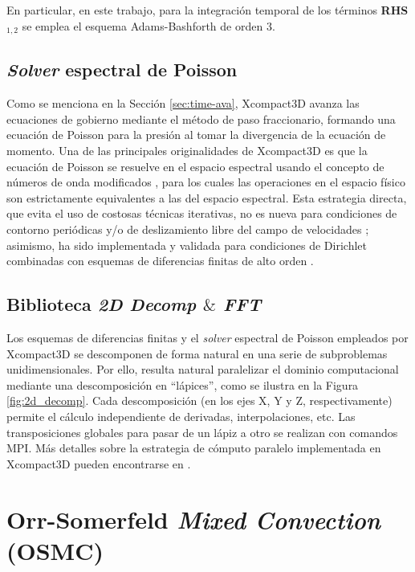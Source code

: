 En particular, en este trabajo, para la integración temporal de los términos \textbf{RHS}$_{1,2}$ se emplea el esquema Adams-Bashforth de orden 3.



\subsection{\textit{Solver} espectral de Poisson}

Como se menciona en la Sección \ref{sec:time-ava}, Xcompact3D avanza las ecuaciones de gobierno mediante el método de paso fraccionario, formando una ecuación de Poisson para la presión al tomar la divergencia de la ecuación de momento. Una de las principales originalidades de Xcompact3D es que la ecuación de Poisson se resuelve en el espacio espectral usando el concepto de números de onda modificados \cite{lele1992compact}, para los cuales las operaciones en el espacio físico son estrictamente equivalentes a las del espacio espectral. Esta estrategia directa, que evita el uso de costosas técnicas iterativas, no es nueva para condiciones de contorno periódicas y/o de deslizamiento libre del campo de velocidades \cite{schumann1976direct}; asimismo, ha sido implementada y validada para condiciones de Dirichlet combinadas con esquemas de diferencias finitas de alto orden \cite{laizet2009high}.

\subsection{Biblioteca \textit{2D Decomp $\&$ FFT}}

Los esquemas de diferencias finitas y el \textit{solver} espectral de Poisson empleados por Xcompact3D se descomponen de forma natural en una serie de subproblemas unidimensionales. Por ello, resulta natural paralelizar el dominio computacional mediante una descomposición en “lápices”, como se ilustra en la Figura \ref{fig:2d_decomp}. Cada descomposición (en los ejes X, Y y Z, respectivamente) permite el cálculo independiente de derivadas, interpolaciones, etc. Las transposiciones globales para pasar de un lápiz a otro se realizan con comandos MPI. Más detalles sobre la estrategia de cómputo paralelo implementada en Xcompact3D pueden encontrarse en \cite{laizet2011incompact3d}.



\section{Orr-Somerfeld \textit{Mixed Convection} (OSMC)}

